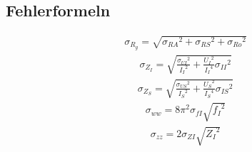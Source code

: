 \documentclass[a4paper,10pt]{scrbook}
\begin{document}
\subsection*{Fehlerformeln}

\begin{align*}\sigma_{R_g}=\sqrt{{\sigma_{{R A}}}^{2} + {\sigma_{{R S}}}^{2} + {\sigma_{{R o}}}^{2}}\end{align*}\begin{align*}\sigma_{Z_I}=\sqrt{\frac{{\sigma_{{U I}}}^{2}}{{I_{I}}^{2}} + \frac{{U_{I}}^{2}}{{I_{I}}^{4}} {\sigma_{{I I}}}^{2}}\end{align*}\begin{align*}\sigma_{Z_S}=\sqrt{\frac{{\sigma_{{U S}}}^{2}}{{I_{S}}^{2}} + \frac{{U_{S}}^{2}}{{I_{S}}^{4}} {\sigma_{{I S}}}^{2}}\end{align*}\begin{align*}\sigma_{ww}=8 \pi^{2} {\sigma_{{f I}}} \sqrt{{f_{I}}^{2}}\end{align*}\begin{align*}\sigma_{zz}=2 {\sigma_{{Z I}}} \sqrt{{Z_{I}}^{2}}\end{align*}
\end{document}
